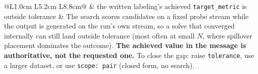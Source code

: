 \documentclass[a4paper,11pt]{article}
\newcommand{\wcode}[1]{\textcolor{warnamber}{\bfseries\ttfamily #1}}
\begin{document}
\begin{longtable}{@{}L{1.0cm} L{5.2cm} L{8.8cm}@{}}
\wcode{309} & the written labeling's achieved \texttt{target\_metric} is outside tolerance & The search scores candidates on a fixed probe stream while the output is generated on the run's own stream, so a solve that converged internally can still land outside tolerance (most often at small $N$, where spillover placement dominates the outcome). \textbf{The achieved value in the message is authoritative, not the requested one.} To close the gap: raise \texttt{tolerance}, use a larger dataset, or use \texttt{scope: pair} (closed form, no search). \\
\bottomrule
\end{longtable}
\end{document}
